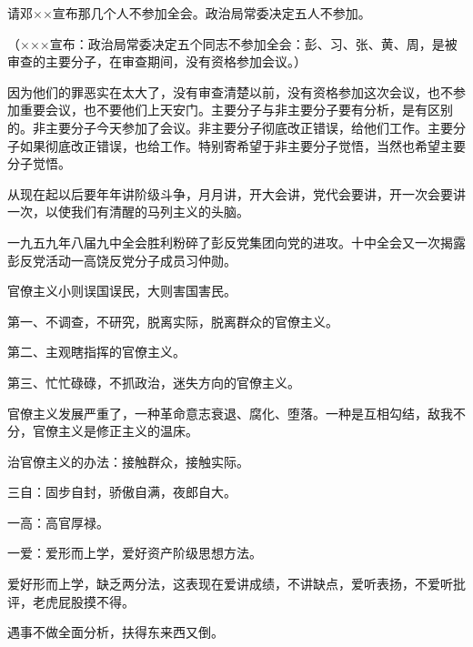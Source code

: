 请邓××宣布那几个人不参加全会。政治局常委决定五人不参加。

（×××宣布：政治局常委决定五个同志不参加全会：彭、习、张、黄、周，是被审查的主要分子，在审查期间，没有资格参加会议。）

因为他们的罪恶实在太大了，没有审查清楚以前，没有资格参加这次会议，也不参加重要会议，也不要他们上天安门。主要分子与非主要分子要有分析，是有区别的。非主要分子今天参加了会议。非主要分子彻底改正错误，给他们工作。主要分子如果彻底改正错误，也给工作。特别寄希望于非主要分子觉悟，当然也希望主要分子觉悟。

从现在起以后要年年讲阶级斗争，月月讲，开大会讲，党代会要讲，开一次会要讲一次，以使我们有清醒的马列主义的头脑。

一九五九年八届九中全会胜利粉碎了彭反党集团向党的进攻。十中全会又一次揭露彭反党活动一高饶反党分子成员习仲勋。

官僚主义小则误国误民，大则害国害民。

第一、不调查，不研究，脱离实际，脱离群众的官僚主义。

第二、主观瞎指挥的官僚主义。

第三、忙忙碌碌，不抓政治，迷失方向的官僚主义。

官僚主义发展严重了，一种革命意志衰退、腐化、堕落。一种是互相勾结，敌我不分，官僚主义是修正主义的温床。

治官僚主义的办法：接触群众，接触实际。

三自：固步自封，骄傲自满，夜郎自大。

一高：高官厚禄。

一爱：爱形而上学，爱好资产阶级思想方法。

爱好形而上学，缺乏两分法，这表现在爱讲成绩，不讲缺点，爱听表扬，不爱听批评，老虎屁股摸不得。

遇事不做全面分析，扶得东来西又倒。

